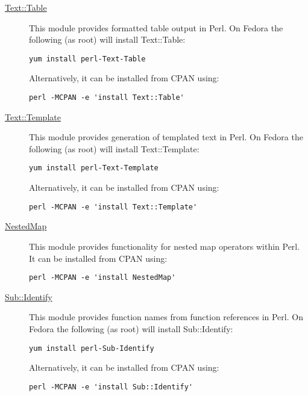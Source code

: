 \begin{description}
  \item [\href{http://search.cpan.org/~anno/Text-Table-1.114/lib/Text/Table.pm}{{\normalfont \ttfamily Text::Table}}] This module provides formatted table output in Perl. On Fedora the following (as root) will install {\normalfont \ttfamily Text::Table}:
\begin{verbatim}
yum install perl-Text-Table
\end{verbatim}
Alternatively, it can be installed from CPAN using:
\begin{verbatim}
perl -MCPAN -e 'install Text::Table'
\end{verbatim}

  \item [\href{http://search.cpan.org/~mjd/Text-Template-1.46/lib/Text/Template.pm}{{\normalfont \ttfamily Text::Template}}] This module provides generation of templated text in Perl. On Fedora the following (as root) will install {\normalfont \ttfamily Text::Template}:
\begin{verbatim}
yum install perl-Text-Template
\end{verbatim}
Alternatively, it can be installed from CPAN using:
\begin{verbatim}
perl -MCPAN -e 'install Text::Template'
\end{verbatim}

\item [\href{http://search.cpan.org/~dcantrell/NestedMap-1.0/lib/NestedMap.pm}{{\normalfont \ttfamily NestedMap}}] This module provides functionality for nested map operators within Perl. It can be installed from CPAN using:
\begin{verbatim}
perl -MCPAN -e 'install NestedMap'
\end{verbatim}

  \item [\href{http://search.cpan.org/~rgarcia/Sub-Identify-0.12/lib/Sub/Identify.pm}{{\normalfont \ttfamily Sub::Identify}}] This module provides function names from function references in Perl. On Fedora the following (as root) will install {\normalfont \ttfamily Sub::Identify}:
\begin{verbatim}
yum install perl-Sub-Identify
\end{verbatim}
Alternatively, it can be installed from CPAN using:
\begin{verbatim}
perl -MCPAN -e 'install Sub::Identify'
\end{verbatim}


\end{description}
